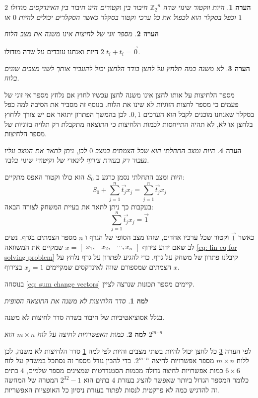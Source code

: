 \documentclass[12pt,leqno]{article}
\theoremstyle{theoremdd}
\newtheorem{lemma}{למה}
\newtheorem{comm}{הערה}
\newcommand{\sumi}[1]{\sum_{#1=1}^n}
\newcommand{\Zn}{{\mathbb{Z}_2}^n}
\begin{document}
\begin{comm}
    היות ווקטור שינוי שדה
    $\Zn$
    חיבור בין וקטורים הינו חיבור בין האינדקסים מודולו 
    $2$
    וכפל בסקלר
    הוא לכפול את כל ערכי וקטור בסקלר
    כאשר הסקלרים יכולים להיות
    $0$
    או 
    $1$
\end{comm}
\begin{comm}
    מספר זוגי של לחיצות אינו משנה את מצב הלוח
\end{comm}
היות 
ואנחנו עובדים על שדה מודולו 
$2$
$t_i + t_i = \vec{0}$.
\begin{comm}
    \label{comm: press is uneven presses}
    לא משנה כמה תלחץ על לחצן בודד הלחצן 
    יכול להעביר אותך לשני מצבים שונים בלוח.
\end{comm}
מספר הלחיצות על אותו לחצן אינו משנה 
לחצן עכשיו 
לחוץ אם נלחץ מספר אי זוגי של פעמים 
כי מספר לחצות הזוגיות לא שינו את הלוח.
בנוסף זה מסביר את הסיבה למה כפל בסקלר שאנחנו מוכנים לקבל הוא הערכים 
$0,1$.
לכן בהמשך
הפתרון יתואר אם יש צורך ללחוץ בלחצן או לא,
לא תהיה התייחסות לכמות הלחיצות כי התוצאה מתקבלת רק תלויה בזוגיות של מספר הלחיצות.
\begin{comm}
    היות ומצב התחלתי הוא שכל הצמתים 
    במצב 
    $0$
    לכן,
    ניתן לתאר 
    את המצב עליו נעבור
    רק
    בעזרת צירוף לינארי של וקיטורי שינוי בלבד.
\end{comm}
היות ומצב התחלתי נסמן כרגע ב
$S_0$
הוא כולו וקטור האפס
מתקיים:
\begin{equation}
    \label{eq: sum change vectors}
    S_0 + \sumi{j} \vec{t_j} x_j=  \sumi{j}  \vec{t_j}x_j
\end{equation}
בעקבות כך ניתן לתאר את בעיית המשחק לצורה הבאה:
\begin{equation}
    \label{eq: lin eq for solving problem}
    \sumi{j} \vec{t_j} x_j = \vec{1}
\end{equation}
כאשר
$\vec{1}$
וקטור שכל ערכיו אחדים,
שזהו מצב הסופי של הגרף
ו
$n$
מספר הצמתים בגרף.
נשים לב 
שאם 
ידוע צירוף
$x = \begin{bmatrix}
    x_1, & x_2, & \cdots , x_n
\end{bmatrix}$
שמקיים את המשוואה 
\ref{eq: lin eq for solving problem}
קיבלנו פתרון של משחק על גרף.
כדי להגיע לפתרון על גרף נלחץ על הצמתים שמספורם 
שווה 
לאינדקסים 
שמקיימים
$x_j = 1$
בצירוף 
$x$.

בנוסחה
\ref{eq: sum change vectors}
קיימים מספר תכונות 
שנרצה לציין.
\begin{lemma}
    \label{lemma: order presses}
    סדר הלחיצות לא משנה את התוצאה הסופית
\end{lemma}
בגלל אסוציאטיביות של חיבור בשדה 
סדר לחיצות לא משנה.
\begin{lemma}
    \label{lemma: num presses}
    כמות האפשרויות לחיצה על לוח
    $m \times n$
    הוא 
    $2^{m \cdot n}$
\end{lemma}
לפי הערה 
\ref{comm: press is uneven presses}
כל לחצן יכול להיות בשתי מצבים 
והיות לפי
למה
\ref{lemma: order presses}
סדר הלחיצות לא משנה,
לכן ללוח
$m \times n$
מספר אפשרויות לחיצה 
$2^{m \cdot n}$.
כדי להבין גודל מספר זה נסתכל במשחק על לוח 
$6 \times 6$
כמות  אפשרויות לחיצה גדולה 
מכמות הסטנדרטית שמציגים מספר שלמים,
$4$
בתים
כלומר המספר הגדול ביותר שאפשר להציג  בעזרת 
$4$
בתים
הוא
$2^{32}-1$
המטרה של המחשה זה להדגיש כמה לא פרקטית לנסות לפתור בעזרת
ניסיון כל האופציות האפשריות.
\end{document}
